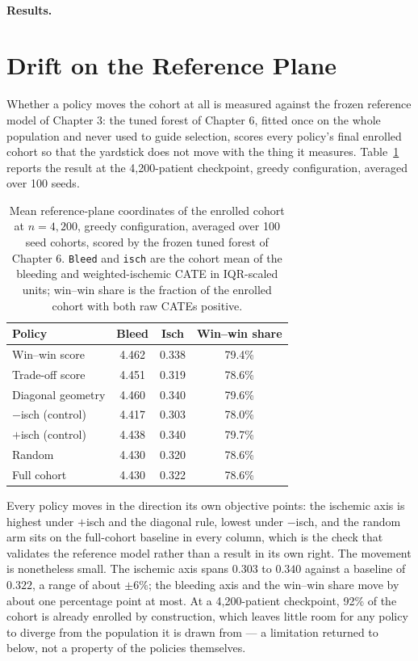 \paragraph{Results.}




\section{Drift on the Reference Plane}

Whether a policy moves the cohort at all is measured against the frozen reference model
of Chapter 3: the tuned forest of Chapter 6, fitted once on the whole population and
never used to guide selection, scores every policy's final enrolled cohort so that the
yardstick does not move with the thing it measures. Table~\ref{tab:ch8-drift} reports the
result at the 4,200-patient checkpoint, greedy configuration, averaged over 100 seeds.

\begin{table}[h]
\centering
\caption{Mean reference-plane coordinates of the enrolled cohort at $n=4{,}200$, greedy
configuration, averaged over 100 seed cohorts, scored by the frozen tuned forest of
Chapter 6. \texttt{Bleed} and \texttt{isch} are the cohort mean of the bleeding and
weighted-ischemic CATE in IQR-scaled units; win--win share is the fraction of the enrolled
cohort with both raw CATEs positive.}
\label{tab:ch8-drift}
\begin{tabular}{lccc}
\toprule
Policy & Bleed & Isch & Win--win share \\
\midrule
Win--win score      & 4.462 & 0.338 & 79.4\% \\
Trade-off score      & 4.451 & 0.319 & 78.6\% \\
Diagonal geometry     & 4.460 & 0.340 & 79.6\% \\
$-$isch (control)    & 4.417 & 0.303 & 78.0\% \\
$+$isch (control)    & 4.438 & 0.340 & 79.7\% \\
Random               & 4.430 & 0.320 & 78.6\% \\
\midrule
Full cohort           & 4.430 & 0.322 & 78.6\% \\
\bottomrule
\end{tabular}
\end{table}

Every policy moves in the direction its own objective points: the ischemic axis is
highest under $+$isch and the diagonal rule, lowest under $-$isch, and the random arm sits
on the full-cohort baseline in every column, which is the check that validates the
reference model rather than a result in its own right. The movement is nonetheless
small. The ischemic axis spans $0.303$ to $0.340$ against a baseline of $0.322$, a range
of about $\pm6\%$; the bleeding axis and the win--win share move by about one percentage
point at most. At a 4,200-patient checkpoint, 92\% of the cohort is already enrolled by
construction, which leaves little room for any policy to diverge from the population it
is drawn from — a limitation returned to below, not a property of the policies
themselves.

